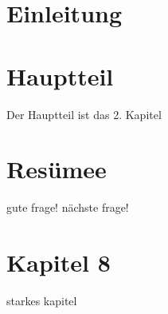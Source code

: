 \documentclass[12pt,a4paper]{article}
\begin{document}
\section{Einleitung}

\section{Hauptteil}

Der Hauptteil ist das 2. Kapitel

\section{Resümee}

gute frage!
nächste frage!


\section{Kapitel 8}
starkes kapitel
\end{document}
